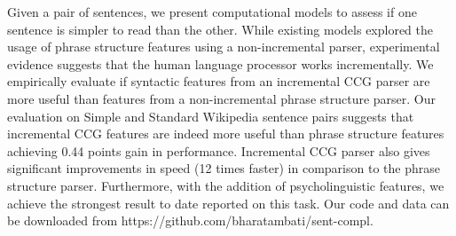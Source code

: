 Given a pair of sentences, we present computational models to assess if one sentence is simpler to read than the other. While existing models explored the usage of phrase structure features using a non-incremental parser, experimental evidence suggests that the human language processor works incrementally. We empirically evaluate if syntactic features from an incremental CCG parser are more useful than features from a non-incremental phrase structure parser. Our evaluation on Simple and Standard Wikipedia sentence pairs suggests that incremental CCG features are indeed more useful than phrase structure features achieving 0.44 points gain in performance. Incremental CCG parser also gives significant improvements in speed (12 times faster) in comparison to the phrase structure parser. Furthermore, with the addition of psycholinguistic features, we achieve the strongest result to date reported on this task. Our code and data can be downloaded from https://github.com/bharatambati/sent-compl.
